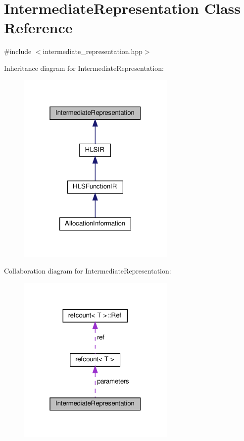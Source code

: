 \hypertarget{classIntermediateRepresentation}{}\section{Intermediate\+Representation Class Reference}
\label{classIntermediateRepresentation}


{\ttfamily \#include $<$intermediate\+\_\+representation.\+hpp$>$}



Inheritance diagram for Intermediate\+Representation\+:
\nopagebreak
\begin{figure}[H]
\begin{center}
\leavevmode
\includegraphics[width=217pt]{db/d01/classIntermediateRepresentation__inherit__graph}
\end{center}
\end{figure}


Collaboration diagram for Intermediate\+Representation\+:
\nopagebreak
\begin{figure}[H]
\begin{center}
\leavevmode
\includegraphics[width=217pt]{d2/d85/classIntermediateRepresentation__coll__graph}
\end{center}
\end{figure}
